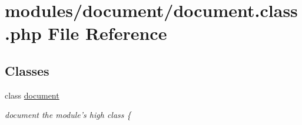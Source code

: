 \hypertarget{document_8class_8php}{\section{modules/document/document.class.\-php File Reference}
\label{document_8class_8php}
}
\subsection*{Classes}
\begin{DoxyCompactItemize}
\item 
class \hyperlink{classdocument}{document}
\begin{DoxyCompactList}\small\item\em document the module's high class \{ \end{DoxyCompactList}\end{DoxyCompactItemize}
